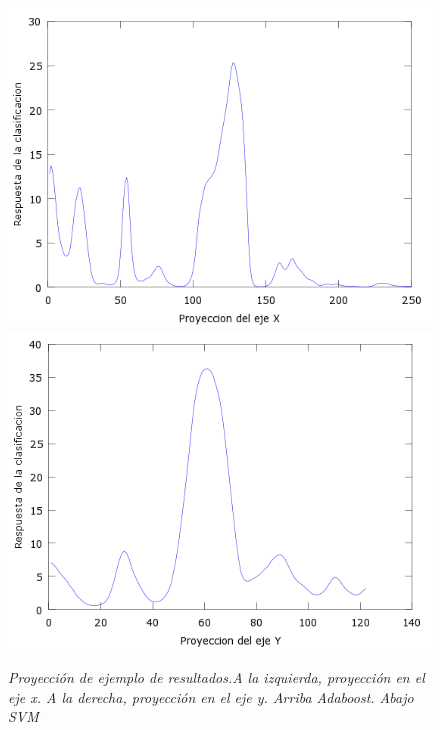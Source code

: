 \begin{figure}[htc]
  \includegraphics[scale=.4]{images/plots/svm1X}
  \includegraphics[scale=.4]{images/plots/svm1Y}
  \caption{\em  Proyección de ejemplo de resultados.A la izquierda, proyección en el eje x. A la derecha, proyección en el eje y. Arriba Adaboost. Abajo SVM}     
  \label{fig:pro1}
\end{figure}

